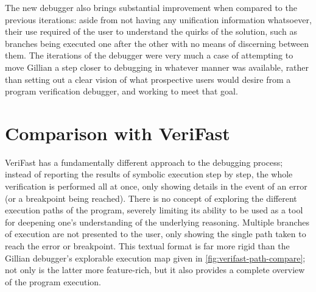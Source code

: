 
The new debugger also brings substantial improvement when compared to the
previous iterations: aside from not having any unification information
whatsoever, their use required of the user to understand the quirks of the
solution, such as branches being executed one after the other with no means of
discerning between them. The iterations of the debugger were very much a case of
attempting to move Gillian a step closer to debugging in whatever manner was
available, rather than setting out a clear vision of what prospective users
would desire from a program verification debugger, and working to meet that
goal.

\section{Comparison with VeriFast}

VeriFast has a fundamentally different approach to the debugging process;
instead of reporting the results of symbolic execution step by step, the whole
verification is performed all at once, only showing details in the event of an
error (or a breakpoint being reached). There is no concept of exploring the
different execution paths of the program, severely limiting its ability to be
used as a tool for deepening one's understanding of the underlying reasoning.
Multiple branches of execution are not presented to the user, only showing the
single path taken to reach the error or breakpoint. This textual format is far
more rigid than the Gillian debugger's explorable execution map given in
\autoref{fig:verifast-path-compare}; not only is the latter more feature-rich,
but it also provides a complete overview of the program execution.

